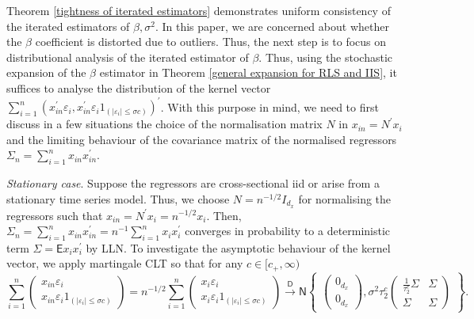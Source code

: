 \documentclass[11pt, letterpaper]{article}
\numberwithin{algorithm}{section}
\numberwithin{assumption}{section}
\numberwithin{lemma}{section}
\numberwithin{theorem}{section}
\numberwithin{corollary}{section}
\numberwithin{remark}{section}
\numberwithin{equation}{section}
\numberwithin{figure}{section}
\numberwithin{table}{section}
\begin{document}
Theorem \ref{tightness of iterated estimators} demonstrates uniform consistency of the iterated estimators of $\beta, \sigma^{2}$. In this paper, we are concerned about whether the $\beta$ coefficient is distorted due to outliers. Thus, the next step is to focus on distributional analysis of the iterated estimator of $\beta$. Thus, using the stochastic expansion of the $\beta$ estimator in Theorem \ref{general expansion for RLS and IIS}, it suffices to analyse the distribution of the kernel vector $\sum_{i = 1}^{n} (x_{in}^{\prime} \varepsilon_{i}, x_{in}^{\prime} \varepsilon_{i} 1_{(|\varepsilon_{i}| \le \sigma c)})^{\prime}$. With this purpose in mind, we need to first discuss in a few situations the choice of the normalisation matrix $N$ in $x_{in} = N^{\prime} x_{i}$ and the limiting behaviour of the covariance matrix of the normalised regressors $\Sigma_{n} = \sum_{i = 1}^{n} x_{in} x_{in}^{\prime}$.

\emph{Stationary case}. Suppose the regressors are cross-sectional iid or arise from a stationary time series model. Thus, we choose $N = n^{-1/2} I_{d_{x}}$ for normalising the regressors such that $x_{in} = N^{\prime} x_{i} = n^{-1/2} x_{i}$. Then, $\Sigma_{n} = \sum_{i = 1}^{n} x_{in} x_{in}^{\prime} = n^{-1} \sum_{i = 1}^{n} x_{i} x_{i}^{\prime}$ converges in probability to a deterministic term $\Sigma = \mathsf{E} x_{i} x_{i}^{\prime}$ by LLN. To investigate the asymptotic behaviour of the kernel vector, we apply martingale CLT so that for any $c \in [c_{+}, \infty)$
\begin{equation*}
\sum_{i = 1}^{n}
\begin{pmatrix}
x_{in} \varepsilon_{i} \\
x_{in} \varepsilon_{i} 1_{(|\varepsilon_{i}| \le \sigma c)}
\end{pmatrix}
=
n^{-1/2} \sum_{i = 1}^{n}
\begin{pmatrix}
x_{i} \varepsilon_{i} \\
x_{i} \varepsilon_{i} 1_{(|\varepsilon_{i}| \le \sigma c)}
\end{pmatrix}
\overset{\mathsf{D}}{\to}
\mathsf{N}
\begin{Bmatrix}
\begin{pmatrix}
0_{d_{x}} \\
0_{d_{x}}
\end{pmatrix}
,
\sigma^{2} \tau_{2}^{c}
\begin{pmatrix}
\frac{1}{\tau_{2}^{c}} \Sigma & \Sigma \\
\Sigma & \Sigma
\end{pmatrix}
\end{Bmatrix}
.
\end{equation*}
\end{document}
